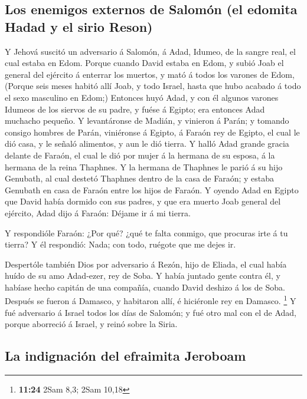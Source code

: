 \hypertarget{los-enemigos-externos-de-salomuxf3n-el-edomita-hadad-y-el-sirio-reson}{%
\subsection{Los enemigos externos de Salomón (el edomita Hadad y el
sirio
Reson)}\label{los-enemigos-externos-de-salomuxf3n-el-edomita-hadad-y-el-sirio-reson}}

 Y Jehová suscitó un adversario á Salomón, á Adad,
Idumeo, de la sangre real, el cual estaba en Edom. 
Porque cuando David estaba en Edom, y subió Joab el general del ejército
á enterrar los muertos, y mató á todos los varones de Edom,
 (Porque seis meses habitó allí Joab, y todo Israel,
hasta que hubo acabado á todo el sexo masculino en Edom;)
 Entonces huyó Adad, y con él algunos varones Idumeos de
los siervos de su padre, y fuése á Egipto; era entonces Adad muchacho
pequeño.  Y levantáronse de Madián, y vinieron á Parán; y
tomando consigo hombres de Parán, viniéronse á Egipto, á Faraón rey de
Egipto, el cual le dió casa, y le señaló alimentos, y aun le dió tierra.
 Y halló Adad grande gracia delante de Faraón, el cual le
dió por mujer á la hermana de su esposa, á la hermana de la reina
Thaphnes.  Y la hermana de Thaphnes le parió á su hijo
Genubath, al cual destetó Thaphnes dentro de la casa de Faraón; y estaba
Genubath en casa de Faraón entre los hijos de Faraón.  Y
oyendo Adad en Egipto que David había dormido con sus padres, y que era
muerto Joab general del ejército, Adad dijo á Faraón: Déjame ir á mi
tierra.

 Y respondióle Faraón: ¿Por qué? ¿qué te falta conmigo,
que procuras irte á tu tierra? Y él respondió: Nada; con todo, ruégote
que me dejes ir.

 Despertóle también Dios por adversario á Rezón, hijo de
Eliada, el cual había huído de su amo Adad-ezer, rey de Soba.
 Y había juntado gente contra él, y habíase hecho capitán
de una compañía, cuando David deshizo á los de Soba. Después se fueron á
Damasco, y habitaron allí, é hiciéronle rey en Damasco. \footnote{\textbf{11:24}
  2Sam 8,3; 2Sam 10,18}  Y fué adversario á Israel todos
los días de Salomón; y fué otro mal con el de Adad, porque aborreció á
Israel, y reinó sobre la Siria.

\hypertarget{la-indignaciuxf3n-del-efraimita-jeroboam}{%
\subsection{La indignación del efraimita
Jeroboam}\label{la-indignaciuxf3n-del-efraimita-jeroboam}}

